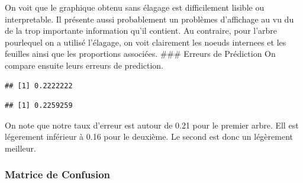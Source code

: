 \documentclass[]{article}
\newenvironment{Shaded}{\begin{snugshade}}{\end{snugshade}}
\newcommand{\DataTypeTok}[1]{\textcolor[rgb]{0.13,0.29,0.53}{#1}}
\newcommand{\FloatTok}[1]{\textcolor[rgb]{0.00,0.00,0.81}{#1}}
\newcommand{\KeywordTok}[1]{\textcolor[rgb]{0.13,0.29,0.53}{\textbf{#1}}}
\newcommand{\NormalTok}[1]{#1}
\newcommand{\OperatorTok}[1]{\textcolor[rgb]{0.81,0.36,0.00}{\textbf{#1}}}
\newcommand{\StringTok}[1]{\textcolor[rgb]{0.31,0.60,0.02}{#1}}
\begin{document}
On voit que le graphique obtenu sans élagage est difficilement lisible
ou interpretable. Il présente aussi probablement un problèmes
d'affichage au vu du de la trop importante information qu'il contient.
Au contraire, pour l'arbre pourlequel on a utilisé l'élagage, on voit
clairement les noeuds internees et les feuilles ainsi que les
proportions associées. \#\#\# Erreurs de Prédiction On compare ensuite
leurs erreurs de prediction.

\begin{Shaded}
\end{Shaded}

\begin{verbatim}
## [1] 0.2222222
\end{verbatim}

\begin{Shaded}
\end{Shaded}

\begin{verbatim}
## [1] 0.2259259
\end{verbatim}

On note que notre taux d'erreur est autour de 0.21 pour le premier
arbre. Ell est légerement inférieur à 0.16 pour le deuxième. Le second
est donc un légèrement meilleur.

\hypertarget{matrice-de-confusion}{%
\subsubsection{Matrice de Confusion}\label{matrice-de-confusion}}
\end{document}
